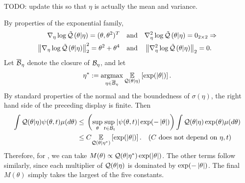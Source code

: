 

%
TODO: update this so that $\eta$ is actually the mean and variance.

By properties of the exponential family,
%
\begin{align*}
%
\lqgrad{\theta \vert \eta} ={} (\theta, \theta^2)^T \mathand&
\lqhess{\theta \vert \eta} ={} 0_{2\times2} \Rightarrow\\
%
\norm{\lqgrad{\theta \vert \eta}}_2^2 ={} \theta^2 + \theta^4 \mathand&
\norm{\lqhess{\theta \vert \eta}}_2 ={} 0.
%
\end{align*}
%
Let $\overline{\mathcal{B}}_\eta$ denote the closure of $\mathcal{B}_\eta$, and let
%
\begin{align*}
%
\eta^* := \argmax_{\eta \in \ballclosed_\eta}
    \expect{\q(\theta \vert \eta)}{\exp(\abs{\theta})}.
%
\end{align*}
%
By standard properties of the normal and the boundedness of $\sigma(\eta)$, the
right hand side of the preceding display is finite.
%
Then
%
\begin{align*}
\int \q(\theta \vert \eta) \psi(\theta, \t) \mu(d \theta) \le{}&
    \left( \sup_{\theta} \sup_{\t \in \ball_\t}
        \abs{\psi(\theta, \t)} \exp(-\abs{\theta}) \right)
    \int \q(\theta \vert \eta) \exp(\theta) \mu(d \theta)
%
\\\le{}&
    \const
    \expect{\q(\theta \vert \eta^*)}{\exp(\abs{\theta})}.
    \quad\constdesc{\eta, \t}
%
\end{align*}
%
Therefore, for , we can take $M(\theta)
\propto \mathcal{Q}(\theta \vert \eta^*) \exp(\left|\theta\right|)$. The other terms follow
similarly, since each multiplier of $\mathcal{Q}(\theta \vert \eta)$ is dominated by
$\exp(-\left|\theta\right|)$.  The final $M(\theta)$ simply takes the largest
of the five constants.
%


